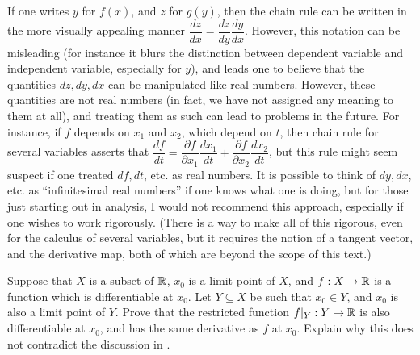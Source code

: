 \setcounter{thm}{16}
\begin{rmk}\label{i:10.1.17}
  If one writes \(y\) for \(f(x)\), and \(z\) for \(g(y)\), then the chain rule can be written in the more visually appealing manner \(\dfrac{dz}{dx} = \dfrac{dz}{dy} \dfrac{dy}{dx}\).
  However, this notation can be misleading (for instance it blurs the distinction between dependent variable and independent variable, especially for \(y\)), and leads one to believe that the quantities \(dz, dy, dx\) can be manipulated like real numbers.
  However, these quantities are not real numbers (in fact, we have not assigned any meaning to them at all), and treating them as such can lead to problems in the future.
  For instance, if \(f\) depends on \(x_1\) and \(x_2\), which depend on \(t\), then chain rule for several variables asserts that \(\dfrac{df}{dt} = \dfrac{\partial f}{\partial x_1} \dfrac{dx_1}{dt} + \dfrac{\partial f}{\partial x_2} \dfrac{dx_2}{dt}\), but this rule might seem suspect if one treated \(df, dt\), etc. as real numbers.
  It is possible to think of \(dy, dx\), etc. as ``infinitesimal real numbers'' if one knows what one is doing, but for those just starting out in analysis, I would not recommend this approach, especially if one wishes to work rigorously.
  (There is a way to make all of this rigorous, even for the calculus of several variables, but it requires the notion of a tangent vector, and the derivative map, both of which are beyond the scope of this text.)
\end{rmk}

\exercisesection

\begin{ex}\label{i:ex:10.1.1}
  Suppose that \(X\) is a subset of \(\mathbb{R}\), \(x_0\) is a limit point of \(X\), and \(f : X \to \mathbb{R}\) is a function which is differentiable at \(x_0\).
  Let \(Y \subseteq X\) be such that \(x_0 \in Y\), and \(x_0\) is also a limit point of \(Y\).
  Prove that the restricted function \(f|_Y : Y \to \mathbb{R}\) is also differentiable at \(x_0\), and has the same derivative as \(f\) at \(x_0\).
  Explain why this does not contradict the discussion in .
\end{ex}

